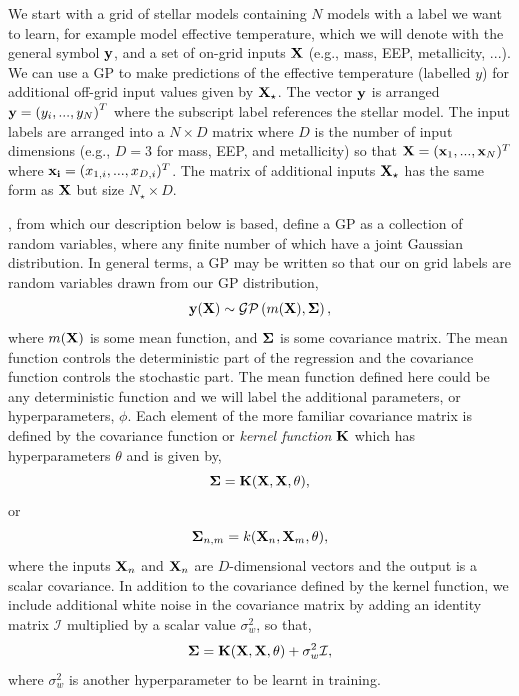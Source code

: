 We start with a grid of stellar models containing $N$ models with a label we want to learn, for example model effective temperature, which we will denote with the general symbol $\bf y$, and a set of on-grid inputs $\bf X$ (e.g., mass,  EEP,  metallicity,  ...).  We can use a GP to make predictions of the effective temperature (labelled $y$) for additional off-grid input values given by $\bf X_{\star}$.  The vector $\bf y$ is arranged ${\bf y} = \left(y_{i}, ... ,y_{N} \right)^{T}$ where the subscript label references the stellar model.  The input labels are arranged into a $N \times D$ matrix where $D$ is the number of input dimensions (e.g., $D=3$ for mass, EEP, and metallicity) so that ${\bf X} = ({\bf x}_{1}, ..., {\bf x}_{N})^{T}$ where ${\bf x_{i}} = (x_{1, i}, ..., x_{D, i})^{T}$.  The matrix of additional inputs $\bf X_{\star}$ has the same form as $\bf X$ but size $N_{\star} \times D$.

\citet{williams1996gaussian}, from which our description below is based,  define a GP as a collection of random variables, where any finite number of which have a joint Gaussian distribution.  In general terms,  a GP may be written so that our on grid labels are random variables drawn from our GP distribution, 
\begin{equation}
{\bf y}({\bf X}) \sim \mathcal{GP}\left( m({\bf X}),  {\bf \Sigma}\right),
\end{equation}
where $m({\bf X})$ is some mean function, and $\bf \Sigma$ is some covariance matrix.  The mean function controls the deterministic part of the regression and the covariance function controls the stochastic part.  The mean function defined here could be any deterministic function and we will label the additional parameters, or hyperparameters, $\phi$.  Each element of the more familiar covariance matrix is defined by the covariance function or {\it kernel function} $\bf K$ which has hyperparameters $\theta$ and is given by,
\begin{equation}
{\bf \Sigma} = {\bf K}({\bf X}, {\bf X},  \theta),
\end{equation}
or 
\begin{equation}
{\bf \Sigma}_{n, m} = k({\bf X}_{n}, {\bf X}_{m},  \theta),
\end{equation}
where the inputs ${\bf X}_{n}$ and ${\bf X}_{n}$ are $D$-dimensional vectors and the output is a scalar covariance.
In addition to the covariance defined by the kernel function, we include additional white noise in the covariance matrix by adding an identity matrix $\mathcal{I}$ multiplied by a scalar value $\sigma_{w}^2$, so that, 
\begin{equation}
{\bf \Sigma} = {\bf K}({\bf X}, {\bf X},  \theta) + \sigma_{w}^{2} \mathcal{I},
\end{equation}
where $\sigma_{w}^2$ is another hyperparameter to be learnt in training. 


